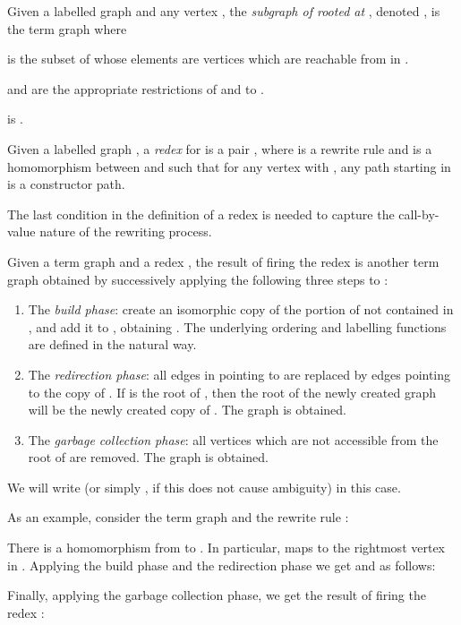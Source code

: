 \documentclass{LMCS}
\newenvironment{varitemize}
{
\begin{list}{\labelitemi}
{\setlength{\itemsep}{0.0mm}
 \setlength{\topsep}{0.0mm}
 \setlength{\parindent}{0.0mm}
 \setlength{\parskip}{0.0mm}
 \setlength{\parsep}{0.0mm}
 \setlength{\partopsep}{0.0mm}
 \setlength{\leftmargin}{15pt}
 \setlength{\labelsep}{5pt}
 \setlength{\labelwidth}{10pt}}}
{
 \end{list} 
}
\begin{document}
\begin{defi}[Subgraph]
Given a labelled graph  
and any vertex , the \emph{subgraph of  rooted
at }, denoted , is the
term graph  where
\begin{varitemize}
\item
   is the subset of  whose elements
  are vertices which are reachable from  in .
\item
   and  are
  the appropriate restrictions of  and 
  to .
\item
   is .
\end{varitemize}
\end{defi}
\begin{defi}[Redex]
Given a labelled graph , a \emph{redex} for  is
a pair , where  is a rewrite rule 
 and  is a homomorphism
between  and 
such that for any vertex 
with , 
any path starting in  is a constructor path.
\end{defi}
The last condition in the definition of a redex is needed to
capture the call-by-value nature of the rewriting process.

Given a term graph  and a redex ,
the result of firing the redex is another term graph obtained by
successively applying the following three steps to :
\begin{enumerate}[1.]
\item
  The \emph{build phase}: create an isomorphic copy of the portion of
   not contained in
  , and add it to , obtaining .
  The underlying ordering and labelling functions are defined in the natural
  way.
\item
  The \emph{redirection phase}: all edges in  pointing to 
  are replaced by edges pointing to the copy of . If 
  is the root of , then the root of the newly created graph will be
  the newly created copy of . The graph  is obtained.
\item
  The \emph{garbage collection phase}: all vertices which are not accessible
  from the root of  are removed. The graph  is obtained.
\end{enumerate}
We will write  (or simply
, if this does not cause ambiguity) in this case.

As an example, consider the term graph  and the rewrite rule 
:

There is a homomorphism  from
 to
. In particular,  maps  to
the rightmost vertex in .
Applying the build phase and the redirection phase we get 
and  as follows:

Finally, applying the garbage collection phase, we get the
result of firing the redex :
\end{document}
